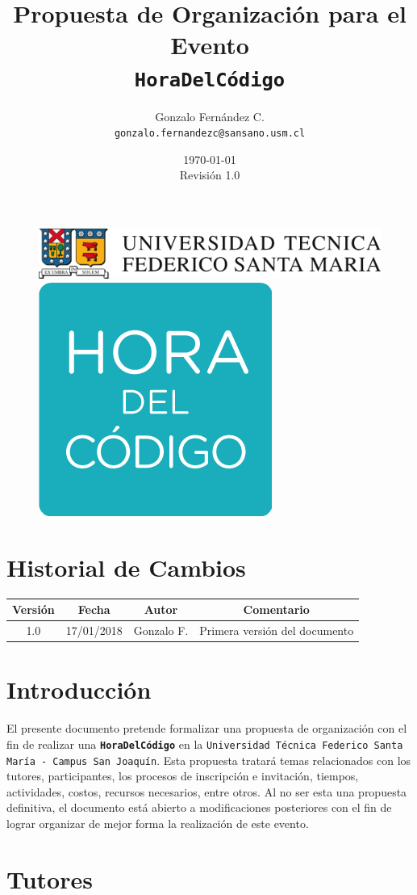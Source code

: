 \documentclass[letterpaper,12pt]{article}
\title{Propuesta de Organización para el Evento \\ \texttt{\textbf{HoraDelCódigo}} }
\author{Gonzalo Fernández C. \\ \texttt{gonzalo.fernandezc@sansano.usm.cl} }
\date{\today\\Revisión 1.0}
\begin{document}
\begin{titlepage}

\begin{figure}
\includegraphics[width=0.4\linewidth]{logou} 
\hspace{\fill}
\includegraphics[width=0.08\linewidth]{logo} 
\end{figure}

\maketitle

\end{titlepage}


\section{Historial de Cambios}

\begin{center}
\begin{tabular}{|c|c|c|c|}
\hline
Versión & Fecha & Autor & Comentario \\
\hline \hline
1.0 & 17/01/2018 & Gonzalo F. & Primera versión del documento \\ \hline
\end{tabular}
\end{center}

\section{Introducción}

El presente documento pretende formalizar una propuesta de organización con el fin de realizar una \texttt{\textbf{HoraDelCódigo}} en la \texttt{Universidad Técnica Federico Santa María - Campus San Joaquín}. Esta propuesta tratará temas relacionados con los tutores, participantes, los procesos de inscripción e invitación, tiempos, actividades, costos, recursos necesarios, entre otros. Al no ser esta una propuesta definitiva, el documento está abierto a modificaciones posteriores con el fin de lograr organizar de mejor forma la realización de este evento.

\section{Tutores}
\end{document}
